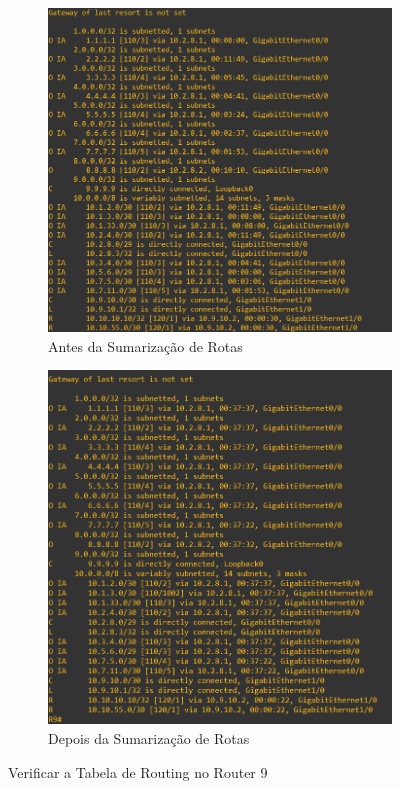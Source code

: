 \documentclass[11pt,english, openright, oneside]{book}
\begin{document}
\begin{figure}[h]
  \centering
  \begin{subfigure}{.51\textwidth}
      \centering
      \includegraphics[width=1\linewidth]{imagens/Tarefa5/25.before_show_ip_route_R9.png}
      \caption{Antes da Sumarização de Rotas}
  \end{subfigure}%
  \begin{subfigure}{.49\textwidth}
      \centering
      \includegraphics[width=.95\linewidth]{imagens/Tarefa5/25.after_show_ip_route_R9.png}
      \caption{Depois da Sumarização de Rotas}
  \end{subfigure}
  \caption{Verificar a Tabela de Routing no Router 9}
  \label{fig:config46}
\end{figure}
\vspace{0.2cm}
\end{document}
